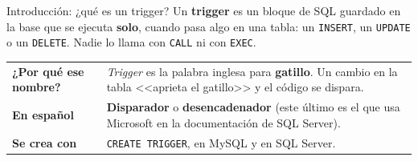\documentclass[aspectratio=169,10pt,c]{beamer}
\newcommand{\tbl}[1]{\textcolor{utpNaranja}{\texttt{#1}}}
\newcommand{\kw}[1]{\textcolor{utpRojo}{\textbf{#1}}}
\begin{document}
\begin{frame}{Introducción: ¿qué es un trigger?}
\small Un \textbf{trigger} es un bloque de SQL guardado en la base que se ejecuta \textbf{solo}, cuando pasa algo en una tabla: un \texttt{INSERT}, un \texttt{UPDATE} o un \texttt{DELETE}. Nadie lo llama con \texttt{CALL} ni con \texttt{EXEC}.
\vspace{0.25cm}
\begin{center}
\end{center}
\vspace{0.15cm}
\begin{center}
\footnotesize
\renewcommand{\arraystretch}{1.35}
\begin{tabular}{>{\raggedright\bfseries}p{3.2cm}>{\raggedright\arraybackslash}p{9.3cm}}
\toprule
¿Por qué ese nombre? & \textit{Trigger} es la palabra inglesa para \textbf{gatillo}. Un cambio en la tabla <<aprieta el gatillo>> y el código se dispara. \\
En español & \textbf{Disparador} o \textbf{desencadenador} (este último es el que usa Microsoft en la documentación de SQL Server). \\
Se crea con & \texttt{CREATE TRIGGER}, en MySQL y en SQL Server. \\
\bottomrule
\end{tabular}
\end{center}
\end{frame}
\end{document}
